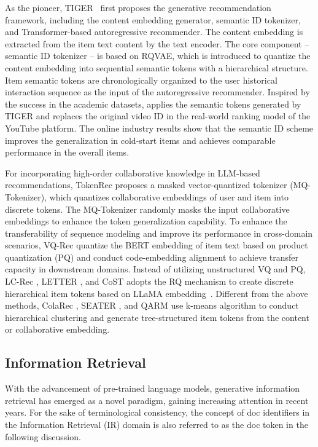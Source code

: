 As the pioneer, TIGER~\cite{rajput2023tiger} first proposes the generative recommendation framework, including the content embedding generator, semantic ID tokenizer, and Transformer-based autoregressive recommender. The content embedding is extracted from the item text content by the text encoder. The core component -- semantic ID tokenizer -- is based on RQVAE, which is introduced to quantize the content embedding into sequential semantic tokens with a hierarchical structure. Item semantic tokens are chronologically organized to the user historical interaction sequence as the input of the autoregressive recommender. Inspired by the success in the academic datasets, \cite{singh2024better} applies the semantic tokens generated by TIGER and replaces the original video ID in the real-world ranking model of the YouTube platform. The online industry results show that the semantic ID scheme improves the generalization in cold-start items and achieves comparable performance in the overall items.

For incorporating high-order collaborative knowledge in LLM-based recommendations, TokenRec \cite{qu2024tokenrec} proposes a masked vector-quantized tokenizer (MQ-Tokenizer), which quantizes collaborative embeddings of user and item into discrete tokens. The MQ-Tokenizer randomly masks the input collaborative embeddings to enhance the token generalization capability.
To enhance the transferability of sequence modeling and improve its performance in cross-domain scenarios, VQ-Rec \cite{hou2023learning} quantize the BERT embedding of item text based on product quantization (PQ) and conduct code-embedding alignment to achieve transfer capacity in downstream domains.
Instead of utilizing unstructured VQ and PQ, LC-Rec \cite{zheng2024adapting}, LETTER \cite{wang2024learnable}, and CoST \cite{zhu2024cost} adopts the RQ mechanism to create discrete hierarchical item tokens based on LLaMA embedding~\cite{touvron2023llama}.
Different from the above methods, ColaRec \cite{wang2024content}, SEATER \cite{si2024generative}, and QARM \cite{luo2024qarm} use k-means algorithm to conduct hierarchical clustering and generate tree-structured item tokens from the content or collaborative embedding.

\subsection{Information Retrieval}

With the advancement of pre-trained language models, generative information retrieval \cite{li2024matching} has emerged as a novel paradigm, gaining increasing attention in recent years. For the sake of terminological consistency, the concept of doc identifiers in the Information Retrieval (IR) domain is also referred to as the doc token in the following discussion.


